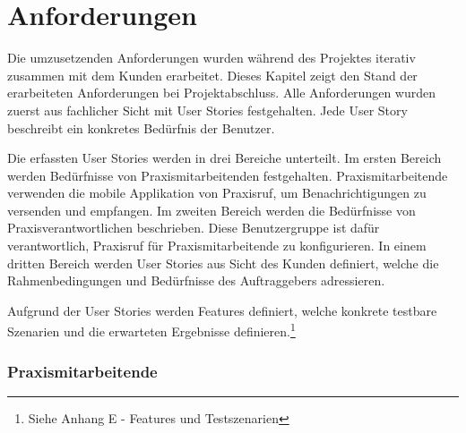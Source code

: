 \section{Anforderungen}\label{sec:anforderungen}

Die umzusetzenden Anforderungen wurden während des Projektes iterativ zusammen mit dem Kunden erarbeitet.
Dieses Kapitel zeigt den Stand der erarbeiteten Anforderungen bei Projektabschluss.
Alle Anforderungen wurden zuerst aus fachlicher Sicht mit User Stories festgehalten.
Jede User Story beschreibt ein konkretes Bedürfnis der Benutzer.

Die erfassten User Stories werden in drei Bereiche unterteilt.
Im ersten Bereich werden Bedürfnisse von Praxismitarbeitenden festgehalten.
Praxismitarbeitende verwenden die mobile Applikation von Praxisruf, um Benachrichtigungen zu versenden und empfangen.
Im zweiten Bereich werden die Bedürfnisse von Praxisverantwortlichen beschrieben.
Diese Benutzergruppe ist dafür verantwortlich, Praxisruf für Praxismitarbeitende zu konfigurieren.
In einem dritten Bereich werden User Stories aus Sicht des Kunden definiert, welche die Rahmenbedingungen und Bedürfnisse des Auftraggebers adressieren.

Aufgrund der User Stories werden Features definiert, welche konkrete testbare Szenarien und die erwarteten Ergebnisse definieren.\footnote{Siehe Anhang E - Features und Testszenarien}

\subsubsection*{Praxismitarbeitende}

